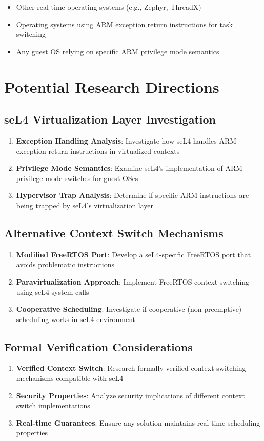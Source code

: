 \documentclass[11pt]{article}
\begin{document}
\begin{itemize}
    \item Other real-time operating systems (e.g., Zephyr, ThreadX)
    \item Operating systems using ARM exception return instructions for task switching
    \item Any guest OS relying on specific ARM privilege mode semantics
\end{itemize}

\section{Potential Research Directions}

\subsection{seL4 Virtualization Layer Investigation}
\begin{enumerate}
    \item \textbf{Exception Handling Analysis}: Investigate how seL4 handles ARM exception return instructions in virtualized contexts
    \item \textbf{Privilege Mode Semantics}: Examine seL4's implementation of ARM privilege mode switches for guest OSes
    \item \textbf{Hypervisor Trap Analysis}: Determine if specific ARM instructions are being trapped by seL4's virtualization layer
\end{enumerate}

\subsection{Alternative Context Switch Mechanisms}
\begin{enumerate}
    \item \textbf{Modified FreeRTOS Port}: Develop a seL4-specific FreeRTOS port that avoids problematic instructions
    \item \textbf{Paravirtualization Approach}: Implement FreeRTOS context switching using seL4 system calls
    \item \textbf{Cooperative Scheduling}: Investigate if cooperative (non-preemptive) scheduling works in seL4 environment
\end{enumerate}

\subsection{Formal Verification Considerations}
\begin{enumerate}
    \item \textbf{Verified Context Switch}: Research formally verified context switching mechanisms compatible with seL4
    \item \textbf{Security Properties}: Analyze security implications of different context switch implementations
    \item \textbf{Real-time Guarantees}: Ensure any solution maintains real-time scheduling properties
\end{enumerate}
\end{document}

